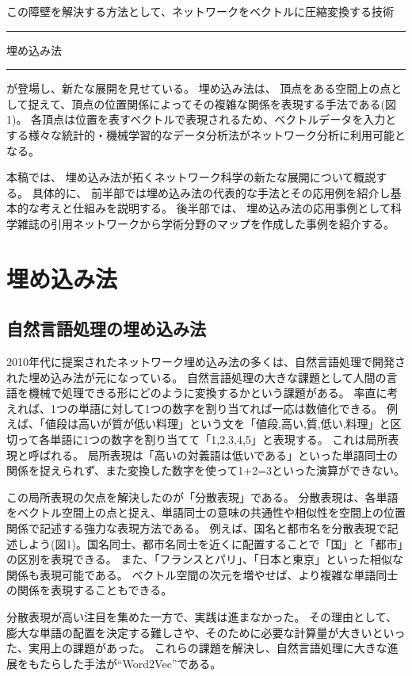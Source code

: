 \documentclass[J]{scitrans}
\def\ddash{\rule[0.33zh]{2zw}{.03zh}}
\begin{document}
この障壁を解決する方法として、ネットワークをベクトルに圧縮変換する技術\ddash 埋め込み法\ddash が登場し、新たな展開を見せている。
埋め込み法は、 頂点をある空間上の点として捉えて、頂点の位置関係によってその複雑な関係を表現する手法である(図1)。
各頂点は位置を表すベクトルで表現されるため、ベクトルデータを入力とする様々な統計的・機械学習的なデータ分析法がネットワーク分析に利用可能となる。

本稿では、 埋め込み法が拓くネットワーク科学の新たな展開について概説する。
具体的に、 前半部では埋め込み法の代表的な手法とその応用例を紹介し基本的な考えと仕組みを説明する。
後半部では、 埋め込み法の応用事例として科学雑誌の引用ネットワークから学術分野のマップを作成した事例を紹介する。

\section{埋め込み法}

\subsection{自然言語処理の埋め込み法}

2010年代に提案されたネットワーク埋め込み法の多くは、自然言語処理で開発された埋め込み法が元になっている。
自然言語処理の大きな課題として人間の言語を機械で処理できる形にどのように変換するかという課題がある。
率直に考えれば、1つの単語に対して1つの数字を割り当てれば一応は数値化できる。
例えば、「値段は高いが質が低い料理」という文を「値段,高い,質,低い,料理」と区切って各単語に1つの数字を割り当てて「1,2,3,4,5」と表現する。
これは局所表現と呼ばれる。
局所表現は「高いの対義語は低いである」といった単語同士の関係を捉えられず、また変換した数字を使って1+2=3といった演算ができない。

この局所表現の欠点を解決したのが「分散表現」である。
分散表現は、各単語をベクトル空間上の点と捉え、単語同士の意味の共通性や相似性を空間上の位置関係で記述する強力な表現方法である。
例えば、国名と都市名を分散表現で記述しよう(図1)。国名同士、都市名同士を近くに配置することで「国」と「都市」の区別を表現できる。
また、「フランスとパリ」、「日本と東京」といった相似な関係も表現可能である。
ベクトル空間の次元を増やせば、より複雑な単語同士の関係を表現することもできる。

分散表現が高い注目を集めた一方で、実践は進まなかった。
その理由として、膨大な単語の配置を決定する難しさや、そのために必要な計算量が大きいといった、実用上の課題があった。
これらの課題を解決し、自然言語処理に大きな進展をもたらした手法が``Word2Vec''である。
\end{document}

